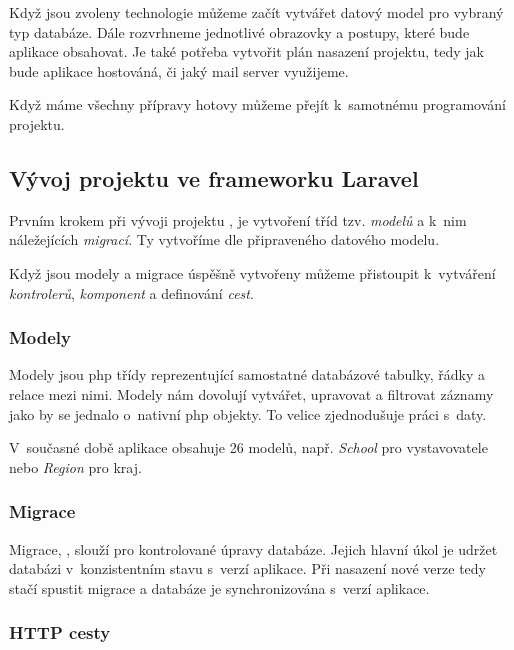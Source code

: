 Když jsou zvoleny technologie můžeme začít vytvářet datový model pro vybraný typ databáze. Dále rozvrhneme jednotlivé obrazovky a postupy, které bude aplikace obsahovat. Je také potřeba vytvořit plán nasazení projektu, tedy jak bude aplikace hostováná, či jaký mail server využijeme.

Když máme všechny přípravy hotovy můžeme přejít k~samotnému programování projektu.

\subsection{Vývoj projektu ve frameworku Laravel}
\label{sub:laravel-development}

Prvním krokem při vývoji projektu \inlaravel, je vytvoření tříd tzv. \emph{modelů}\cite{laravel-models} a k~nim náležejících \emph{migrací}\cite{laravel-migrations}. Ty vytvoříme dle připraveného datového modelu.

Když jsou modely a migrace úspěšně vytvořeny můžeme přistoupit k~vytváření \emph{kontrolerů}\cite{laravel-controller}, \emph{komponent}\cite{laravel-blade-component} a definování \emph{cest}\cite{laravel-routes}.

\subsubsection{Modely}

Modely jsou \acrshort{php} třídy reprezentující samostatné databázové tabulky, řádky a relace mezi nimi. Modely nám dovolují vytvářet, upravovat a filtrovat záznamy jako by se jednalo o~nativní \acrshort{php} objekty. To velice zjednodušuje práci s~daty.

V~současné době aplikace \bso obsahuje 26 modelů, např. \emph{School} pro vystavovatele nebo \emph{Region} pro kraj. 

\subsubsection{Migrace}

Migrace, \inlaravel, slouží pro kontrolované úpravy databáze. Jejich hlavní úkol je udržet databázi v~konzistentním stavu s~verzí aplikace. Při nasazení nové verze tedy stačí spustit migrace a databáze je synchronizována s~verzí aplikace.

\subsubsection{HTTP cesty}

